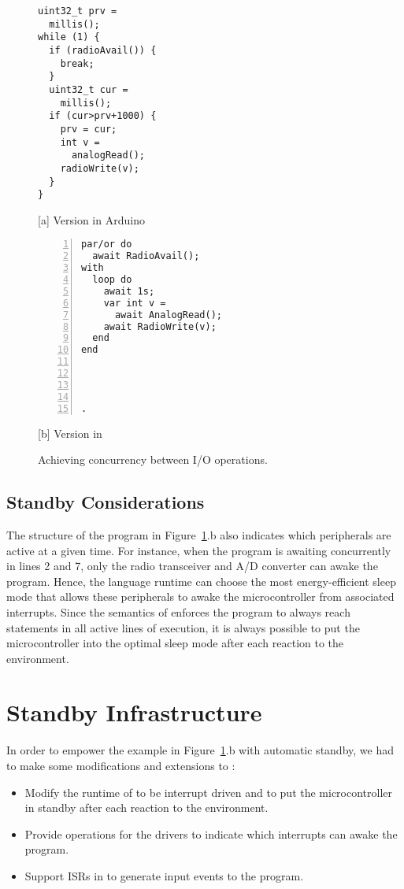 \begin{figure}[t]
\begin{minipage}[t]{0.49\linewidth}
\begin{lstlisting}[xrightmargin=0.5cm]
uint32_t prv =
  millis();
while (1) {
  if (radioAvail()) {
    break;
  }
  uint32_t cur =
    millis();
  if (cur>prv+1000) {
    prv = cur;
    int v =
      analogRead();
    radioWrite(v);
  }
}
\end{lstlisting}
\centering\small{[a] Version in Arduino}
\end{minipage}
%
\begin{minipage}[t]{0.49\linewidth}
\begin{lstlisting}[numbers=left,xleftmargin=-0.2cm]
par/or do
  await RadioAvail();
with
  loop do
    await 1s;
    var int v =
      await AnalogRead();
    await RadioWrite(v);
  end
end




.
\end{lstlisting}
\centering\small{[b] Version in \CEU}
\end{minipage}
\caption{ Achieving concurrency between I/O operations.
\label{lst.inversion}
}
\end{figure}

\subsection*{Standby Considerations}
\label{sec.ceu.standby}

The structure of the program in Figure~\ref{lst.inversion}.b also indicates
which peripherals are active at a given time.
%
For instance, when the program is awaiting concurrently in lines 2 and 7,
only the radio transceiver and A/D converter can awake the program.
Hence, the language runtime can choose the most energy-efficient sleep mode
that allows these peripherals to awake the microcontroller from associated
interrupts.
%
Since the semantics of \CEU enforces the program to always reach 
statements in all active lines of execution, it is always possible to put the
microcontroller into the optimal sleep mode after each reaction to the
environment.

\section{Standby Infrastructure}
\label{sec.standby}

In order to empower the example in Figure~\ref{lst.inversion}.b with automatic
standby, we had to make some modifications and extensions to \CEU:
%
\begin{itemize}
\item Modify the runtime of \CEU to be interrupt driven and to put the
      microcontroller in standby after each reaction to the environment.
\item Provide operations for the drivers to indicate which interrupts can awake
      the program.
\item Support ISRs in \CEU to generate input events to the program.
\end{itemize}

